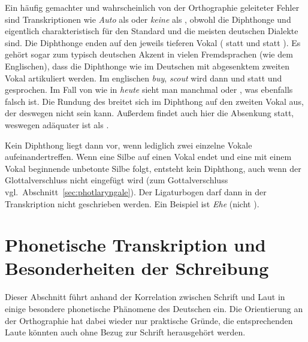 \begin{exe}
  \ex\label{ex:phot2005}
  \begin{xlist}
  \end{xlist}
\end{exe}

Ein häufig gemachter und wahrscheinlich von der Orthographie geleiteter Fehler sind Transkriptionen wie \textit{Auto} als \Ast\textipa{[P\t{aU}to]} oder \textit{keine} als \Ast\textipa{[k\t{aI}ne]}, obwohl die Diphthonge \textipa{[\t{aE}]} und \textipa{[\t{aO}]} eigentlich charakteristisch für den Standard und die meisten deutschen Dialekte sind.
Die Diphthonge enden auf den jeweils tieferen Vokal (\textipa{[O]} statt \textipa{[U]} und \textipa{[E]} statt \textipa{[I]}).
Es gehört sogar zum typisch deutschen Akzent in vielen Fremdsprachen (wie \zB dem Englischen), dass die Diphthonge wie im Deutschen mit abgesenktem zweiten Vokal artikuliert werden.
Im englischen \textit{buy}, \textit{scout} wird dann \textipa{[b\t{aE}]} und \textipa{[sk\t{aO}t]} statt \textipa{[b\t{aI}]} und \textipa{[sk\t{aU}t]} gesprochen.
Im Fall von \textipa{[\t{O\oe}]} wie in \textit{heute} \textipa{[h\t{O\oe}t@]} sieht man manchmal \textipa{[\t{OI}]} oder \textipa{[\t{OY}]}, was ebenfalls falsch ist.
Die Rundung des \textipa{[o]} breitet sich im Diphthong auf den zweiten Vokal aus, der deswegen nicht \textipa{[I]} sein kann.
Außerdem findet auch hier die Absenkung statt, weswegen \textipa{[\t{O\oe}]} adäquater ist als \textipa{[\t{OY}]}.

Kein Diphthong liegt dann vor, wenn lediglich zwei einzelne Vokale aufeinandertreffen.
Wenn eine Silbe auf einen Vokal endet und eine mit einem Vokal beginnende unbetonte Silbe folgt, entsteht kein Diphthong, auch wenn der Glottalverschluss nicht eingefügt wird (zum Gottalverschluss vgl.\ Abschnitt~\ref{sec:photlaryngale}).
Der Ligaturbogen darf dann in der Transkription nicht geschrieben werden.
Ein Beispiel ist \textit{Ehe} \textipa{[Pe:@]} (nicht \Ast\textipa{[P\t{e@}]}).

\section{Phonetische Transkription und Besonderheiten der Schreibung}

\label{sec:phonetischebesonderheiten}

Dieser Abschnitt führt anhand der Korrelation zwischen Schrift und Laut in einige besondere phonetische Phänomene des Deutschen ein.
Die Orientierung an der Orthographie hat dabei wieder nur praktische Gründe, die entsprechenden Laute könnten auch ohne Bezug zur Schrift herausgehört werden.

